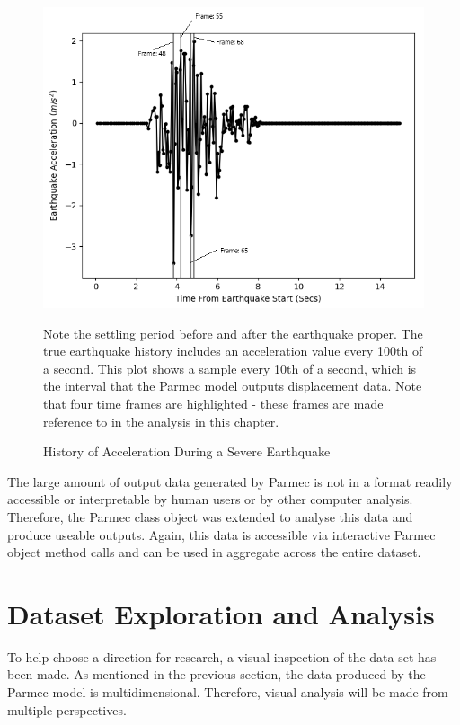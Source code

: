 \begin{figure}[ht]
	\centering
	\includegraphics[scale=0.85]{Figures/earthquake_time_points}
	\caption{History of Acceleration During a Severe Earthquake} {Note the settling period before and after the earthquake proper. The true earthquake history includes an acceleration value every 100th of a second. This plot shows a sample every 10th of a second, which is the interval that the Parmec model outputs displacement data. Note that four time frames are highlighted - these frames are made reference to in the analysis in this chapter.}
	\label{fig:earthquake}
\end{figure}

\noindent
The large amount of output data generated by Parmec is not in a format readily accessible or interpretable by human users or by other computer analysis. Therefore, the Parmec class object was extended to analyse this data and produce useable outputs. Again, this data is accessible via interactive Parmec object method calls and can be used in aggregate across the entire dataset.


\section{Dataset Exploration and Analysis}

To help choose a direction for research, a visual inspection of the data-set has been made. As mentioned in the previous section, the data produced by the Parmec model is multidimensional. Therefore, visual analysis will be made from multiple perspectives.

